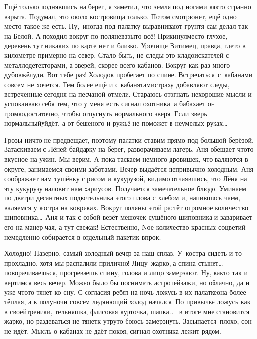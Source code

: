 Ещё только поднявшись на берег, я заметил, что земля под ногами как\sdash то странно взрыта. Подумал, это около костровища только. Потом смотрю\mdash нет, ещё одно место такое же есть. Ну,~иногда под палатку выравнивают грунт\mdash я сам делал так на Белой. А походил вокруг по поляне\mdash взрыто всё! Прикинул\mdash место глухое, деревень тут никаких по карте нет и близко. Урочище Витимец, правда, где\sdash то в километре примерно на север. Стало быть, не следы это кладоискателей с металлодетекторами, а зверей, скорее всего кабанов. Вокруг как раз много дубов\mdash жёлуди. Вот тебе раз! Холодок пробегает по спине. Встречаться~с~кабанами совсем не хочется. Тем более ещё и с кабанятами\mdash страху добавляют следы, встреченные сегодня на песчаной отмели. Стараюсь отогнать нехорошие мысли и успокаиваю себя тем, что у меня есть сигнал охотника, а бабахает он громко\mdash достаточно, чтобы отпугнуть нормального зверя. Если зверь нормальный\mdash уйдёт, а от бешеного и ружьё не поможет в неумелых руках\ldots 

Грозы ничто не предвещает, поэтому палатки ставим прямо под большой берёзой. Затаскиваем с Лёней байдарку на берег, разворачиваем лагерь. Аня обещает что\sdash то вкусное на ужин. Мы верим. А пока таскаем немного дровишек, что валяются в округе, занимаемся своими заботами. Вечер выдаётся непривычно холодным. Аня соображает нам тушёнку с рисом и кукурузой, видимо отчаявшись, что Лёня на эту кукурузу наловит нам хариусов. Получается замечательное блюдо. Уминаем по два\sdash три десантных подкотельника этого плова с хлебом и, напившись чаем, валяемся у костра на ковриках. Вокруг поляны этой растёт огромное количество шиповника\ldots~Аня и так с собой везёт мешочек сушёного шиповника и заваривает его на манер чая, а тут свежак! Естественно, N\sdash ое количество красных соцветий немедленно собирается в отдельный пакетик впрок.

Холодно! Наверно, самый холодный вечер за наш сплав. У~костра сидеть и то прохладно, хотя мы распалили прилично! Лицу~жарко, а спина стынет\ldots~ поворачиваешься, прогреваешь спину, голова и лицо замерзают. Ну, как\sdash то так и вертимся весь вечер. Можно было бы поснимать астропейзажи, но облачно, да и уже что\sdash то тянет ко сну. С согласия ребят на ночь ложусь в их палатке\mdash она более тёплая, а к полуночи совсем ледянющий холод начался. По привычке ложусь как в своей\mdash треники, тельняшка, флисовая курточка, шапка\ldots~ в итоге мне становится жарко, но раздеваться не тянет\mdash к утру\sdash то боюсь замерзнуть. Засыпается~плохо, сон не идёт. Мысль о кабанах не даёт покоя, сигнал охотника лежит рядом. 

\begin{center}
\end{center}